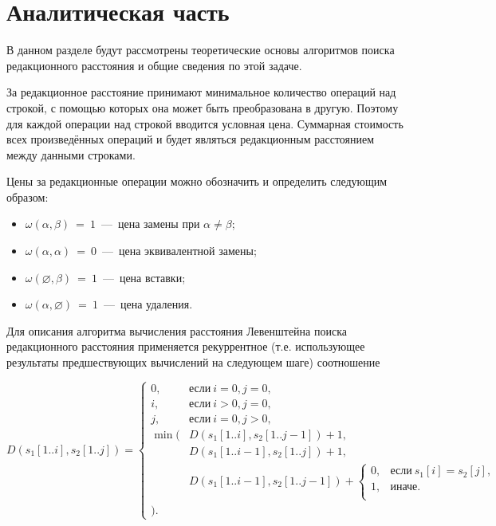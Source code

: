 \chapter{Аналитическая часть}
В данном разделе будут рассмотрены теоретические основы алгоритмов поиска редакционного расстояния и общие сведения по этой задаче.

За редакционное расстояние принимают минимальное количество операций над строкой, с помощью которых она может быть преобразована в другую. Поэтому для каждой операции над строкой вводится условная цена. Суммарная стоимость всех произведённых операций и будет являться редакционным расстоянием между данными строками.

Цены за редакционные операции можно обозначить  и определить следующим образом:
\begin{itemize}
	\item $\omega(\alpha,\beta)~=~1$~---~цена замены при $\alpha \neq \beta$;
	\item $\omega(\alpha,\alpha)~=~0$~---~цена эквивалентной замены;
	\item $\omega(\varnothing,\beta)~=~1$~---~цена вставки;
	\item $\omega(\alpha,\varnothing)~=~1$~---~цена удаления.
\end{itemize}

Для описания алгоритма вычисления расстояния Левенштейна поиска редакционного расстояния применяется рекуррентное (т.е. использующее результаты предшествующих вычислений на следующем шаге) соотношение

\begin{equation}
\label{eqn:lev_formula}
	D(s_1[1..i], s_2[1..j]) = \begin{cases}
      	0,& \text{если}\ i = 0, j = 0, \\ 
        i,& \text{если}\ i > 0, j = 0, \\ 
        j,& \text{если}\ i = 0, j > 0, \\
     
      \min ( & D(s_1[1..i], s_2[1..j - 1]) + 1, \\
      & D(s_1[1..i - 1], s_2[1..j]) + 1, \\
      & D(s_1[1..i - 1], s_2[1..j - 1]) + \begin{cases}
      0, & \text{если}\ s_1[i] = s_2[j], \\
      1, & \text{иначе}. \\
      \end{cases} \\
      ).
      \end{cases}
\end{equation}

